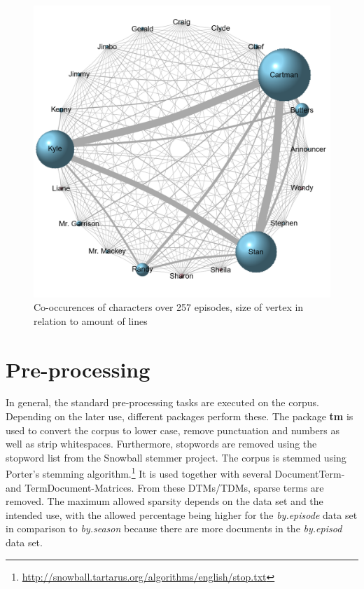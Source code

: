 \documentclass[10pt,a4paper]{article}
\begin{document}
	
	\begin{figure}[h]
	\centering
	\includegraphics[scale=0.85]{images/CoOccurenceMatrix.png}
	\caption{Co-occurences of characters over 257 episodes, size of vertex in relation to amount of lines}
	\label{fig:CoOccurence}
	\end{figure}
	
	
	\section{Pre-processing}
	In general, the standard pre-processing tasks are executed on the corpus. Depending on the later use, different packages perform these.
	The package \textbf{tm} is used to convert the corpus to lower case, remove punctuation and numbers as well as strip whitespaces. Furthermore, stopwords are removed using the stopword list from the Snowball stemmer project. The corpus is stemmed using Porter's stemming algorithm.\footnote{\url{http://snowball.tartarus.org/algorithms/english/stop.txt}} It is used together with several DocumentTerm- and TermDocument-Matrices. From these DTMs/TDMs, sparse terms are removed. The maximum allowed sparsity depends on the data set and the intended use, with the allowed percentage being higher for the \textit{by.episode} data set in comparison to \textit{by.season} because there are more documents in the \textit{by.episod} data set. 
	
\end{document}
